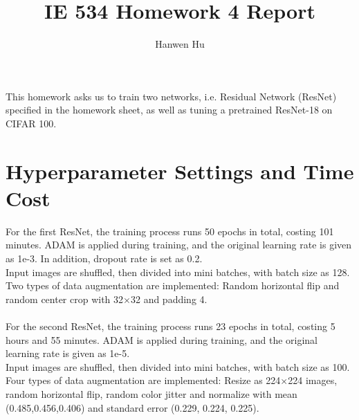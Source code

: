 \documentclass[15pt]{article}
\title{IE 534 Homework 4 Report}
\author{Hanwen Hu}
\begin{document}
\maketitle

This homework asks us to train two networks, i.e. Residual Network (ResNet) specified in the homework sheet, as well as tuning a pretrained ResNet-18 on CIFAR 100.

\section{Hyperparameter Settings and Time Cost}
For the first ResNet, the training process runs 50 epochs in total, costing 101 minutes. ADAM is applied during training, and the original learning rate is given as 1e-3. In addition, dropout rate is set as 0.2. \\
Input images are shuffled, then divided into mini batches, with batch size as 128. Two types of data augmentation are implemented: Random horizontal flip and random center crop with 32$\times$32 and padding 4.\\
\\
For the second ResNet, the training process runs 23 epochs in total, costing 5 hours and 55 minutes. ADAM is applied during training, and the original learning rate is given as 1e-5.\\
Input images are shuffled, then divided into mini batches, with batch size as 100. Four types of data augmentation are implemented: Resize as 224$\times$224 images, random horizontal flip, random color jitter and normalize with mean (0.485,0.456,0.406) and standard error (0.229, 0.224, 0.225).\\
\end{document}
